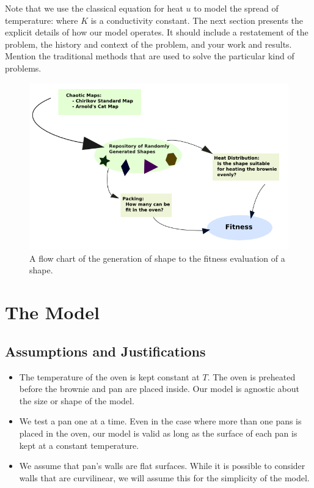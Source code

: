 \documentclass[12pt]{reedmcm}
\begin{document}
Note that we use the classical equation for heat $u$ to model the spread of temperature:
where $K$ is a conductivity constant. The next section presents the explicit details of how our model operates.
It should include a restatement of the problem, the history and context of the problem, and your work and results.
Mention the traditional methods that are used to solve the particular kind of problems.
%
\begin{figure}[t]
  \centering
  \includegraphics[width=1.0\textwidth]{fitness_flowchart}
  \caption{A flow chart of the generation of shape to the fitness evaluation of a shape.}
  \label{fig:fitnessflow}
\end{figure}

\section{The Model}
\subsection{Assumptions and Justifications}
\begin{itemize}
  \item The temperature of the oven is kept constant at $T$.
   The oven is preheated before the brownie and pan are placed inside.
   Our model is agnostic about the size or shape of the model.

  \item We test a pan one at a time. 
  Even in the case where more than one pans is placed in the oven, our model is valid as long as the surface of each pan is kept at a constant temperature.

  \item We assume that pan's walls are flat surfaces. While it is possible to consider walls that are curvilinear, we will assume this for the simplicity of the model.
\end{itemize}
\end{document}
